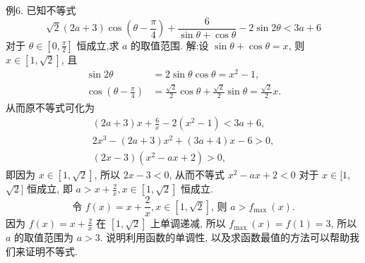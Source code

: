 例6. 已知不等式
$$
\sqrt{2}(2 a+3) \cos \left(\theta-\frac{\pi}{4}\right)+\frac{6}{\sin \theta+\cos \theta}-2 \sin 2 \theta<3 a+6
$$
对于 $\theta \in\left[0, \frac{\pi}{2}\right]$ 恒成立,求 $a$ 的取值范围.
解:设 $\sin \theta+\cos \theta=x$, 则 $x \in[1, \sqrt{2}]$, 且
$$
\begin{aligned}
\sin 2 \theta & =2 \sin \theta \cos \theta=x^2-1, \\
\cos \left(\theta-\frac{\pi}{4}\right) & =\frac{\sqrt{2}}{2} \cos \theta+\frac{\sqrt{2}}{2} \sin \theta=\frac{\sqrt{2}}{2} x .
\end{aligned}
$$
从而原不等式可化为
$$
\begin{gathered}
(2 a+3) x+\frac{6}{x}-2\left(x^2-1\right)<3 a+6, \\
2 x^3-(2 a+3) x^2+(3 a+4) x-6>0, \\
(2 x-3)\left(x^2-a x+2\right)>0,
\end{gathered}
$$
即因为 $x \in[1, \sqrt{2}]$, 所以 $2 x-3<0$, 从而不等式 $x^2-a x+2<0$ 对于 $x \in[1$, $\sqrt{2}]$ 恒成立, 即 $a>x+\frac{2}{x}, x \in[1, \sqrt{2}]$ 恒成立.
$$
\text { 令 } f(x)=x+\frac{2}{x}, x \in[1, \sqrt{2}] \text {, 则 } a>f_{\text {max }}(x) \text {. }
$$
因为 $f(x)=x+\frac{2}{x}$ 在 $[1, \sqrt{2}]$ 上单调递减, 所以 $f_{\text {max }}(x)=f(1)=3$, 所以 $a$ 的取值范围为 $a>3$.
说明利用函数的单调性, 以及求函数最值的方法可以帮助我们来证明不等式.



